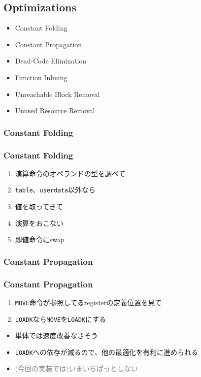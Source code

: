 \subsection{Optimizations}
\begin{frame}
	\frametitlesubs
	\begin{itemize}
		\item Constant Folding
		\item Constant Propagation
		\item Dead-Code Elimination
		\item Function Inlining
		\item Unreachable Block Removal
		\item Unused Resource Removal
	\end{itemize}
\end{frame}
\subsubsection{Constant Folding}
\begin{frame}[fragile]
	\frametitle{Constant Folding}

	\begin{enumerate}
		\item 演算命令のオペランドの型を調べて
		\item \lstinline{table}、\lstinline{userdata}\alert<2->{以外なら} \uncover<3->{$\Leftarrow$ \structure{メタメソッド}を考慮}
		\item 値を取ってきて
		\item 演算をおこない
		\item 即値命令にswap
	\end{enumerate}
\end{frame}
\subsubsection{Constant Propagation}
\begin{frame}[fragile]
	\frametitle{Constant Propagation}

	\begin{enumerate}
		\item \lstinline{MOVE}命令が参照してるregisterの定義位置を見て
		\item \lstinline{LOADK}なら\lstinline{MOVE}を\lstinline{LOADK}にする
	\end{enumerate}

	\pause
	\begin{itemize}
		\item 単体では速度改善なさそう
		\item \lstinline{LOADK}への依存が減るので、他の最適化を有利に進められる
		\item[] <3-> \textcolor{gray}{(今回の実装では)いまいちぱっとしない}
	\end{itemize}
\end{frame}
